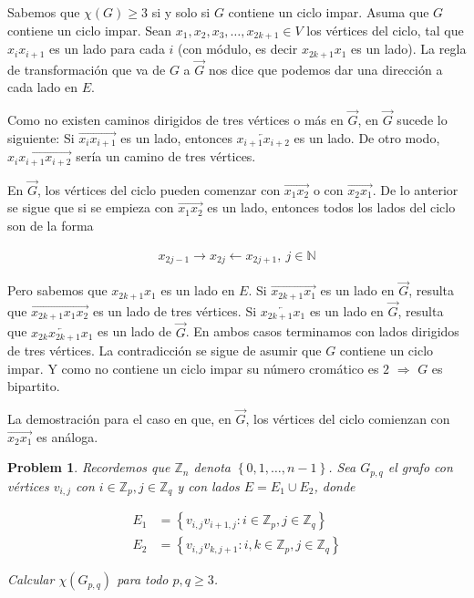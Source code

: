 \documentclass[a4paper, 12pt]{article}
\newtheorem{problem}{Problem}
\newtheorem{problem}{Problem}
\begin{document}
Sabemos que $\chi(G) \geq 3$ si y solo si $G$ contiene un ciclo impar. Asuma
que $G$ contiene un ciclo impar. Sean $x_1, x_2, x_3, \ldots, x_{2k+1} \in V$ los
vértices del ciclo, tal que $x_i x_{i+1}$ es un lado para cada $i$ (con módulo, 
es decir $x_{2k+1} x_1$ es un lado). La regla de transformación que va de $G$ a
$\overrightarrow{G}$ nos dice que podemos dar una dirección a cada lado en $E$.

Como no existen caminos dirigidos de tres vértices o más en
$\overrightarrow{G}$, en  $\overrightarrow{G}$ sucede lo siguiente: Si
$\overrightarrow{x_i x_{i+1}}$ es un lado, entonces
$\overleftarrow{x_{i+1}x_{i+2}}$ es un lado. De otro modo, $\overrightarrow{x_i
x_{i+1}x_{i+2}}$ sería un camino de tres vértices. 

En $\overrightarrow{G}$, los vértices del ciclo pueden 
comenzar con $\overrightarrow{x_1 x_2}$ o con $\overrightarrow{x_2 x_1}$. De lo anterior se sigue que si 
se empieza con $\overrightarrow{x_1 x_2}$ es un lado, entonces todos los lados
del ciclo son de la forma 

\begin{align*}
    x_{2j - 1} \to x_{2j } \leftarrow x_{2j  + 1}, ~ j \in \mathbb{N}
\end{align*}

Pero sabemos que $x_{2k+1}x_1$ es un lado en $E$. Si $\overrightarrow{x_{2k+1}
x_1}$ es un lado en $\overrightarrow{G}$, resulta que
$\overrightarrow{x_{2k+1}x_1 x_2}$ es un lado de tres vértices. Si
$\overleftarrow{x_{2k+1}x_1}$ es un lado en $\overrightarrow{G}$, resulta que
$\overleftarrow{x_{2k}x_{2k+1}x_1}$ es un lado de $\overrightarrow{G}$. En
ambos casos terminamos con lados dirigidos de tres vértices. La contradicción
se sigue de asumir que $G$ contiene un ciclo impar. Y como no contiene un ciclo
impar su número cromático es $2$ $ \Rightarrow $ $G$ es bipartito.

La demostración para el caso en que, en $\overrightarrow{G}$, los vértices
del ciclo comienzan con $\overrightarrow{x_2 x_1}$ es análoga.

\pagebreak 

\begin{problem}
    Recordemos que $\mathbb{Z}_n$ denota $\left\{ 0, 1, \ldots, n - 1 \right\}
    $. Sea $G_{p, q}$ el grafo con vértices $v_{i, j}$ con $i \in \mathbb{Z}_p,
    j \in \mathbb{Z}_q$ y con lados $E = E_1 \cup E_2$, donde 

    \begin{align*}
        E_1 &= \left\{ v_{i, j} v_{i+1, j} : i \in \mathbb{Z}_p, j \in \mathbb{Z}_q  \right\}  \\ 
        E_2 &= \left\{ v_{i, j} v_{k, j + 1 } : i, k \in \mathbb{Z}_p, j \in \mathbb{Z}_q \right\} 
    \end{align*}

    Calcular $\chi(G_{p, q})$ para todo $p, q \geq 3$.
\end{problem}
\end{document}
